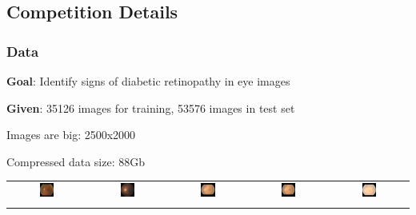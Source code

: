\documentclass{beamer}
\begin{document}
\subsection{Competition Details}
\begin{frame}\frametitle{Data} 
\par \textbf{Goal}: Identify signs of diabetic retinopathy in eye images
\par \textbf{Given}: 35126 images for training, 53576 images in test set
\par Images are big: 2500x2000
\par Compressed data size: 88Gb

\vspace{5pt}

\begin{tabular}{|@{}c@{}|@{}c@{}|@{}c@{}|@{}c@{}|@{}c@{}|}
\hline
	\includegraphics[width=0.2\textwidth]{pics/197_left_0.jpg} &
	\includegraphics[width=0.2\textwidth]{pics/257_left_2.jpg} &
	\includegraphics[width=0.2\textwidth]{pics/328_right_3.jpg} &
	\includegraphics[width=0.2\textwidth]{pics/328_right_3.jpg} &
	\includegraphics[width=0.2\textwidth]{pics/326_left_4.jpg} \\\noalign{\vspace{-0.15cm}}
\hline


\end{tabular}
\end{frame}
\end{document}
